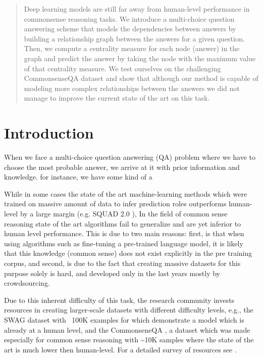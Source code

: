 \documentclass{article}
\begin{document}
\begin{abstract}
Deep learning models are still far away from human-level performance in commonsense reasoning tasks.
We introduce a multi-choice question answering scheme that models the dependencies between answers by
building a relationship graph between the answers for a given question. 
Then, we compute a centrality measure for each node (answer) in the graph and predict the answer by taking the node with the maximum value of that centrality measure.
We test ourselves on the challenging CommonsenseQA dataset and show that although our method is capable of modeling more complex relationships between the answers we did not manage to improve the current state of the art on this task.
\end{abstract}

\section{Introduction}
When we face a multi-choice question answering (QA) problem where we have to choose the most probable answer, we arrive at it with prior information and knowledge. for instance, we have some kind of a


While in some cases the state of the art machine-learning methods which were trained on massive amount of data to infer prediction roles
outperforms human-level by a large margin (e.g. SQUAD 2.0 \cite{rajpurkar2018know}),
In the field of common sense reasoning  \cite{talmor2018commonsenseqa} state of the art algorithms fail to generalize and are yet inferior to human level performance.
This is due to two main reasons: first, is that when using algorithms such as fine-tuning a pre-trained language model, it is likely that this knowledge (common sense) does not exist explicitly in the pre training corpus, and second, is due to the fact that creating massive datasets for this purpose solely is hard, and developed only in the last years mostly by crowdsourcing.

Due to this inherent difficulty of this task, the research community invests resources in creating larger-scale datasets with different difficulty levels, e.g., the SWAG \cite{zellers2018swag} dataset with ~100K examples for which \cite{devlin2018bert} demonstrate a model which is already at a human level, and the CommonseneQA \cite{talmor2018commonsenseqa}, a dataset which was made especially for common sense reasoning with \~{}10K samples where the state of the art is much lower then human-level. For a detailed survey of resources see \cite{storks2019commonsense}. 
\end{document}
